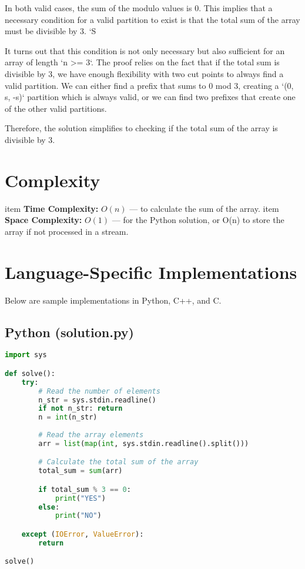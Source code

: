 \documentclass[11pt,a4paper]{article}
\begin{document}
In both valid cases, the sum of the modulo values is 0. This implies that a necessary condition for a valid partition to exist is that the total sum of the array must be divisible by 3.
`S %

It turns out that this condition is not only necessary but also sufficient for an array of length `n >= 3`. The proof relies on the fact that if the total sum is divisible by 3, we have enough flexibility with two cut points to always find a valid partition. We can either find a prefix that sums to 0 mod 3, creating a `(0, s, -s)` partition which is always valid, or we can find two prefixes that create one of the other valid partitions.

Therefore, the solution simplifies to checking if the total sum of the array is divisible by 3.

\section*{Complexity}
\begin{itemize}[leftmargin=*] 
  		item \textbf{Time Complexity:} $O(n)$ — to calculate the sum of the array.
  		item \textbf{Space Complexity:} $O(1)$ — for the Python solution, or O(n) to store the array if not processed in a stream.
\end{itemize}

\section*{Language-Specific Implementations}
Below are sample implementations in Python, C++, and C.

\subsection*{Python (solution.py)}
\begin{lstlisting}[language=Python]
import sys

def solve():
    try:
        # Read the number of elements
        n_str = sys.stdin.readline()
        if not n_str: return
        n = int(n_str)
        
        # Read the array elements
        arr = list(map(int, sys.stdin.readline().split()))

        # Calculate the total sum of the array
        total_sum = sum(arr)

        if total_sum % 3 == 0:
            print("YES")
        else:
            print("NO")

    except (IOError, ValueError):
        return

solve()
\end{lstlisting}
\end{document}
